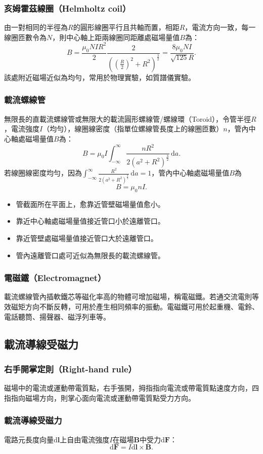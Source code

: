 \documentclass[a4paper,12pt]{report}
\begin{document}
\begin{itemize}
\subsubsection{亥姆霍茲線圈（Helmholtz coil）}
由一對相同的半徑為$R$的圓形線圈平行且共軸而置，相距$R$，電流方向一致，每一線圈匝數令為$N$，則中心軸上距兩線圈同距離處磁場量值$B$為：
\[B=\frac{\mu_0NIR^2}{2}\frac{2}{\left(\left(\frac{R}{2}\right)^2+R^2\right)^{\frac{3}{2}}}=\frac{8\mu_0NI}{\sqrt{125}R}.\]
該處附近磁場近似為均勻，常用於物理實驗，如質譜儀實驗。
\subsubsection{載流螺線管}
無限長的直載流螺線管或無限大的載流圓形螺線管/螺線環（Toroid），令管半徑$R$，電流強度$I$（均勻），線圈線密度（指單位螺線管長度上的線圈匝數）$n$，管內中心軸處磁場量值$B$為：
\[B=\mu_0I\int_{-\infty}^{\infty}\frac{nR^2}{2(a^2+R^2)^{\frac{3}{2}}}\,\mathrm{d}a.\]
若線圈線密度均勻，因為$\int_{-\infty}^{\infty}\frac{R^2}{2(a^2+R^2)^{\frac{3}{2}}}\,\mathrm{d}a=1$，管內中心軸處磁場量值$B$為
\[B=\mu_0nI.\]
\begin{itemize}
\item 管截面所在平面上，愈靠近管壁磁場量值愈小。
\item 靠近中心軸處磁場量值接近管口小於遠離管口。
\item 靠近管壁處磁場量值接近管口大於遠離管口。
\item 管內遠離管口處可近似為無限長的載流螺線管。
\end{itemize}
\subsubsection{電磁鐵（Electromagnet）}
載流螺線管內插軟鐵芯等磁化率高的物體可增加磁場，稱電磁鐵。若通交流電則等效磁矩方向不斷反轉，可用於產生相同頻率的振動。電磁鐵可用於起重機、電鈴、電話聽筒、揚聲器、磁浮列車等。
\subsection{載流導線受磁力}
\subsubsection{右手開掌定則（Right-hand rule）}
磁場中的電流或運動帶電質點，右手張開，拇指指向電流或帶電質點速度方向，四指指向磁場方向，則掌心面向電流或運動帶電質點受力方向。
\subsubsection{載流導線受磁力}
電路元長度向量$\mathrm{d}\mathbf{l}$上自由電流強度$I$在磁場$\mathbf{B}$中受力$\mathrm{d}\mathbf{F}$：
\[\mathrm{d}\mathbf{F}=I\mathrm{d}\mathbf{l}\times\mathbf{B}.\]

\end{itemize}
\end{document}
